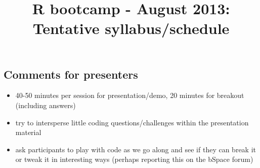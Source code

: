 \documentclass[12pt]{article}\usepackage{graphicx, color}
\begin{document}
\title{R bootcamp - August 2013: Tentative syllabus/schedule}

\maketitle

\subsection*{Comments for presenters}
\begin{itemize}
\item 40-50 minutes per session for presentation/demo, 20 minutes for breakout
(including answers)
\item try to intersperse little coding questions/challenges within the presentation
material
\item ask participants to play with code as we go along and see if they
can break it or tweak it in interesting ways (perhaps reporting this
on the bSpace forum)
\end{itemize}
\end{document}
